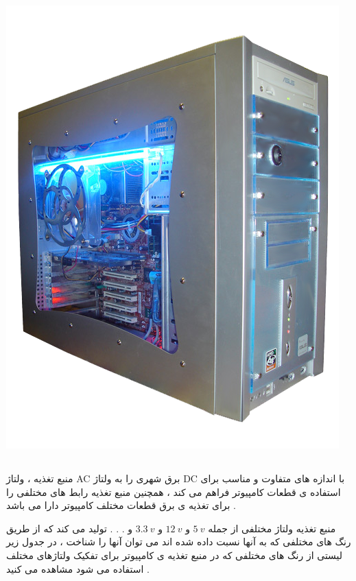 \documentclass[12pt]{book}
\begin{document}
\begin{center}
	\includegraphics[scale=0.4]{./Modified-pc-case.png}
\end{center}


\subsection{}

منبع تغذیه 
 ، ولتاژ AC برق شهری را به ولتاژ  DC با اندازه های متفاوت و مناسب برای استفاده ی قطعات کامپیوتر فراهم می کند ، همچنین منبع تغذیه رابط های مختلفی را برای تغذیه ی برق قطعات مختلف کامپیوتر دارا می باشد .

منبع تغذیه ولتاژ مختلفی از جمله
 $5 \: v$
  و
   $12 \: v$
    و 
    $3.3 \: v$  
    و . . . تولید می کند که از طریق رنگ های مختلفی که به آنها نسبت داده شده اند می توان آنها را شناخت ، در جدول زیر لیستی از رنگ های مختلفی که در منبع تغذیه ی کامپیوتر برای تفکیک ولتاژهای مختلف استفاده می شود مشاهده می کنید .
\end{document}
